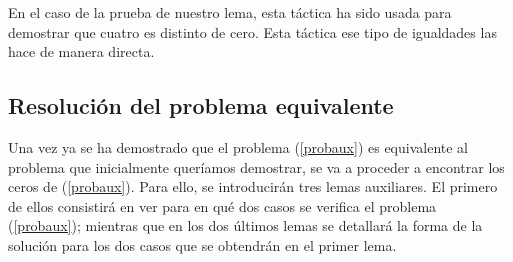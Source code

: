 En el caso de la prueba de nuestro lema, esta táctica ha sido
usada para demostrar que cuatro es distinto de cero. Esta táctica
ese tipo de igualdades las hace de manera directa.

\subsection{Resolución del problema equivalente}\label{secequiv}
Una vez ya se ha demostrado que el problema (\ref{probaux}) es
equivalente al problema que inicialmente queríamos demostrar, se
va a proceder a encontrar los ceros de (\ref{probaux}). Para
ello, se introducirán tres lemas auxiliares. El primero de ellos
consistirá en ver para en qué dos casos se verifica el problema
(\ref{probaux}); mientras que en los dos últimos lemas se detallará
la forma de la solución para los dos casos que se obtendrán en el
primer lema.

